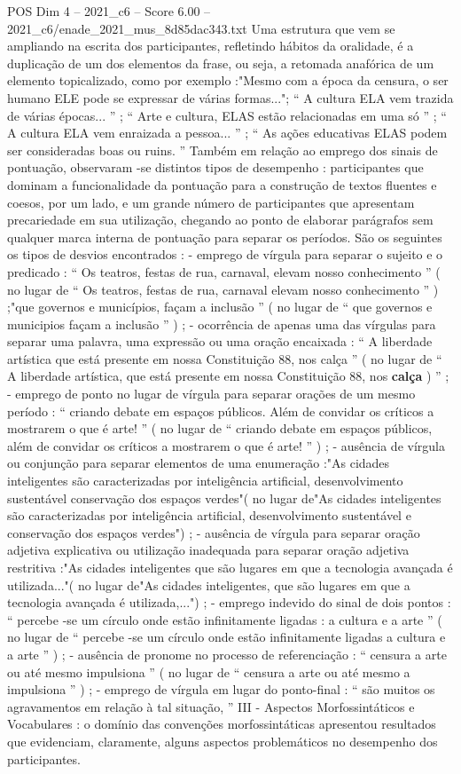 \begin{textsample}{POS Dim 4 – 2021\_c6 – Score 6.00 – 2021\_c6/enade\_2021\_mus\_8d85dac343.txt}
Uma estrutura que vem se ampliando na escrita dos participantes, refletindo hábitos da oralidade, é a duplicação de um dos elementos da frase, ou seja, a retomada anafórica de um elemento topicalizado, como por exemplo :"Mesmo com a época da censura, o ser humano ELE pode se expressar de várias formas..."; “ A cultura ELA vem trazida de várias épocas... ” ; “ Arte e cultura, ELAS estão relacionadas em uma só ” ; “ A cultura ELA vem enraizada a pessoa... ” ; “ As ações educativas ELAS podem ser consideradas boas ou ruins. ” Também em relação ao emprego dos sinais de pontuação, observaram -se distintos tipos de desempenho : participantes que dominam a funcionalidade da pontuação para a construção de textos fluentes e coesos, por um lado, e um grande número de participantes que apresentam precariedade em sua utilização, chegando ao ponto de elaborar parágrafos sem qualquer marca interna de pontuação para separar os períodos.
São os seguintes os tipos de desvios encontrados : - emprego de vírgula para separar o sujeito e o predicado : “ Os teatros, festas de rua, carnaval, elevam nosso conhecimento ” ( no lugar de “ Os teatros, festas de rua, carnaval elevam nosso conhecimento ” ) ;"que governos e municípios, façam a inclusão ” ( no lugar de “ que governos e municipios façam a inclusão ” ) ; - ocorrência de apenas uma das vírgulas para separar uma palavra, uma expressão ou uma oração encaixada : “ A liberdade artística que está presente em nossa Constituição 88, nos calça ” ( no lugar de “ A liberdade artística, que está presente em nossa Constituição 88, nos \textbf{calça} ) ” ; - emprego de ponto no lugar de vírgula para separar orações de um mesmo período : “ criando debate em espaços públicos.
Além de convidar os críticos a mostrarem o que é arte! ” ( no lugar de “ criando debate em espaços públicos, além de convidar os críticos a mostrarem o que é arte! ” ) ; - ausência de vírgula ou conjunção para separar elementos de uma enumeração :"As cidades inteligentes são caracterizadas por inteligência artificial, desenvolvimento sustentável conservação dos espaços verdes"( no lugar de"As cidades inteligentes são caracterizadas por inteligência artificial, desenvolvimento sustentável e conservação dos espaços verdes") ; - ausência de vírgula para separar oração adjetiva explicativa ou utilização inadequada para separar oração adjetiva restritiva :"As cidades inteligentes que são lugares em que a tecnologia avançada é utilizada..."( no lugar de"As cidades inteligentes, que são lugares em que a tecnologia avançada é utilizada,...") ; - emprego indevido do sinal de dois pontos : “ percebe -se um círculo onde estão infinitamente ligadas : a cultura e a arte ” ( no lugar de “ percebe -se um círculo onde estão infinitamente ligadas a cultura e a arte ” ) ; - ausência de pronome no processo de referenciação : “ censura a arte ou até mesmo impulsiona ” ( no lugar de “ censura a arte ou até mesmo a impulsiona ” ) ; - emprego de vírgula em lugar do ponto-final : “ são muitos os agravamentos em relação à tal situação, ” III - Aspectos Morfossintáticos e Vocabulares : o domínio das convenções morfossintáticas apresentou resultados que evidenciam, claramente, alguns aspectos problemáticos no desempenho dos participantes.

\end{textsample}
